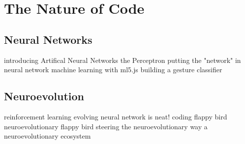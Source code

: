 \chapter{The Nature of Code}
    \section{Neural Networks}
        introducing Artifical Neural Networks
        the Perceptron
        putting the "network" in neural network
        machine learning with ml5.js
        building a gesture classifier
    \section{Neuroevolution}
        reinforcement learning
        evolving neural network is neat!
        coding flappy bird
        neuroevolutionary flappy bird
        steering the neuroevolutionary way
        a neuroevolutionary ecosystem
        